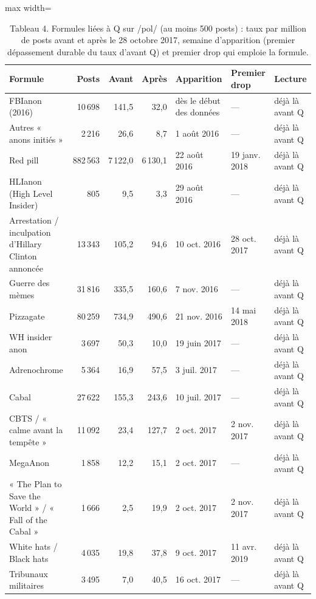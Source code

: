 \documentclass[11pt,a4paper]{article}
\begin{document}
\begin{table}[htbp]
\centering\small
\caption*{Tableau 4. Formules liées à Q sur /pol/ (au moins 500 posts) : taux par million de posts avant et après le 28 octobre 2017, semaine d'apparition (premier dépassement durable du taux d'avant Q) et premier drop qui emploie la formule.}
\begin{adjustbox}{max width=\linewidth}
\begin{tabular}{lrrrlll}
\toprule
\textbf{Formule} & \textbf{Posts} & \textbf{Avant} & \textbf{Après} & \textbf{Apparition} & \textbf{Premier drop} & \textbf{Lecture} \\
\midrule
FBIanon (2016) & 10 698 & 141,5 & 32,0 & dès le début des données & — & déjà là avant Q \\
Autres « anons initiés » & 2 216 & 26,6 & 8,7 & 1 août 2016 & — & déjà là avant Q \\
Red pill & 882 563 & 7 122,0 & 6 130,1 & 22 août 2016 & 19 janv. 2018 & déjà là avant Q \\
HLIanon (High Level Insider) & 805 & 9,5 & 3,3 & 29 août 2016 & — & déjà là avant Q \\
Arrestation / inculpation d'Hillary Clinton annoncée & 13 343 & 105,2 & 94,6 & 10 oct. 2016 & 28 oct. 2017 & déjà là avant Q \\
Guerre des mèmes & 31 816 & 335,5 & 160,6 & 7 nov. 2016 & — & déjà là avant Q \\
Pizzagate & 80 259 & 734,9 & 490,6 & 21 nov. 2016 & 14 mai 2018 & déjà là avant Q \\
WH insider anon & 3 697 & 50,3 & 10,0 & 19 juin 2017 & — & déjà là avant Q \\
Adrenochrome & 5 364 & 16,9 & 57,5 & 3 juil. 2017 & — & déjà là avant Q \\
Cabal & 27 622 & 155,3 & 243,6 & 10 juil. 2017 & — & déjà là avant Q \\
CBTS / « calme avant la tempête » & 11 092 & 23,4 & 127,7 & 2 oct. 2017 & 2 nov. 2017 & déjà là avant Q \\
MegaAnon & 1 858 & 12,2 & 15,1 & 2 oct. 2017 & — & déjà là avant Q \\
« The Plan to Save the World » / « Fall of the Cabal » & 1 666 & 2,5 & 19,9 & 2 oct. 2017 & 2 nov. 2017 & déjà là avant Q \\
White hats / Black hats & 4 035 & 19,8 & 37,8 & 9 oct. 2017 & 11 avr. 2019 & déjà là avant Q \\
Tribunaux militaires & 3 495 & 7,0 & 40,5 & 16 oct. 2017 & — & déjà là avant Q \\

\end{tabular}
\end{adjustbox}
\end{table}
\end{document}
